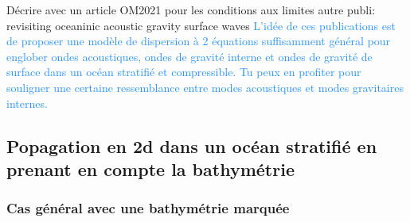 \documentclass{rapportECC}
\newcommand{\FAadd}[1]{\textcolor{DodgerBlue}{{#1}}}                     %
\begin{document}
Décrire avec un article OM2021 pour les conditions aux limites
autre publi: revisiting oceaninic acoustic gravity surface waves
\FAadd{L'idée de ces publications est de proposer une modèle de dispersion à 2 équations suffisamment général pour englober ondes acoustiques, ondes de gravité interne et ondes de gravité de surface dans un océan stratifié et compressible. Tu peux en profiter pour souligner une certaine ressemblance entre modes acoustiques et modes gravitaires internes. }

\subsection{Popagation en 2d dans un océan stratifié en prenant en compte la bathymétrie}


\subsubsection{Cas général avec une bathymétrie marquée}
\end{document}
